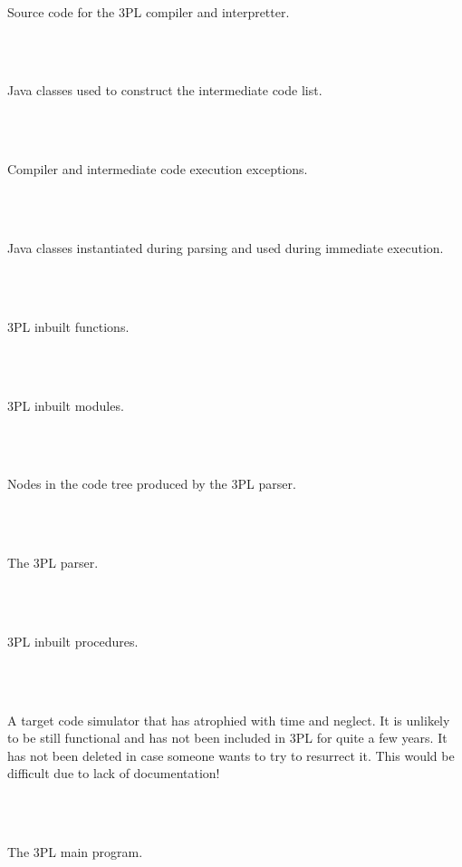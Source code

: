 \begin{tabbing}
        \>\\
            \>\>\>\parbox[t]{12cm}{Source code for the 3PL compiler and
            interpretter.}\\
            
        \>\>\\
            \>\>\>\>\parbox[t]{12cm}{Java classes used to construct the
            intermediate code list.}\\
                
        \>\>\\
            \>\>\>\>\parbox[t]{12cm}{Compiler and intermediate code
            execution exceptions.}\\
                
        \>\>\\
            \>\>\>\>\parbox[t]{12cm}{Java classes instantiated during
                parsing and used during immediate execution.}\\
                
        \>\>\\
            \>\>\>\>\parbox[t]{12cm}{3PL inbuilt functions.}\\
                
        \>\>\\
            \>\>\>\>\parbox[t]{12cm}{3PL inbuilt modules.}\\
                
        \>\>\\
            \>\>\>\>\parbox[t]{12cm}{Nodes in the code tree produced by the
            3PL parser.
                }\\
        \>\>\\
            \>\>\>\>\parbox[t]{12cm}{The 3PL parser.}\\
                
        \>\>\\
            \>\>\>\>\parbox[t]{12cm}{3PL inbuilt procedures.}\\
                
        \>\>\\
            \>\>\>\>\parbox[t]{12cm}{A target code simulator that has
                atrophied with time and neglect. It is unlikely to be still
                functional and has not been included in 3PL for quite a few
                years. It has not been deleted in case someone wants to try
                to resurrect it. This would be difficult due to lack of
                documentation!}\\
            
        \>\>\\
            \>\>\>\>\parbox[t]{12cm}{The 3PL main program.}\\
            
    \end{tabbing}
